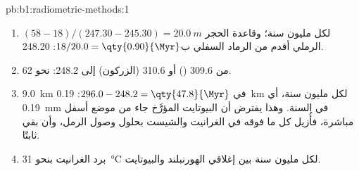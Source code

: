 \begin{solution}{pb:b1:radiometric-methods:1}
\begin{enumerate}
        طبقة الرماد.
  \item $(58 - 18)/(247.30 - 245.30) = \qty{20.0}{m}$ لكل مليون سنة؛ وقاعدة الحجر الرملي
        أقدم من الرماد السفلي ب$18/20.0 = \qty{0.90}{\Myr}$:
        \qty{248.20}{\Ma}.
  \item من \qty{309.6}{\Ma} () أو \qty{310.6}{\Ma} (الزركون) إلى
        \qty{248.2}{\Ma}: نحو \qty{62}{\Myr}.
  \item \qty{9.0}{km} في $296.0 - 248.2 = \qty{47.8}{\Myr}$: \qty{0.19}{km} لكل
        مليون سنة، أي \qty{0.19}{mm} في السنة. وهذا يفترض أن البيوتايت المؤرَّخ جاء من موضع
        أسفل  مباشرة، فأُزيل كل ما فوقه في الغرانيت والشيست بحلول وصول الرمل، وأن
         بقي ثابتًا.
  \item برد الغرانيت بنحو \qty{31}{\celsius} لكل مليون سنة بين إغلاقي الهورنبلند والبيوتايت.
\end{enumerate}
\end{solution}
